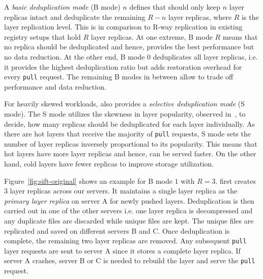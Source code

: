 A \emph{basic deduplication mode} (B mode) $n$ defines that \sysname should only
keep $n$ layer replicas intact and deduplicate the remaining $R-n$ layer
replicas, where $R$ is the layer replication level. This is in comparison to R-way replication in existing registry setups that hold $R$ layer replicas.
%
%
At one extreme, B mode $R$ means that no replica should be deduplicated and
hence, provides the best performance but no data reduction.
%
At the other end, B mode $0$ deduplicates all layer replicas, i.e. it provides
the highest deduplication ratio but adds restoration overhead for every
\texttt{pull} request.
%
The remaining B modes in between allow to trade off performance and data
reduction.
%
 

For heavily skewed workloads, \sysname also provides a \emph{selective
deduplication mode} (S mode).
%
The S mode utilizes the skewness in layer popularity, observed
in~\cite{dockerworkload}, to decide, how many replicas should be deduplicated
for each layer individually.
%
As there are hot layers that receive the majority of \texttt{pull} requests,
S mode sets the number of layer replicas inversely proportional to its
popularity.
%
This means that hot layers have more layer replicas and
hence, can be served faster.
%
On the other hand, cold layers have fewer replicas to improve storage utilization.

Figure~\ref{fig:sift-original} shows an example for B mode $1$ with $R=3$.
\sysname first creates 3 layer replicas across our servers. It maintains a single layer replica as the \emph{primary layer replica} on
server A for newly pushed layers.
%
Deduplication is then carried out in one of the other servers i.e. one layer replica is decompressed and any duplicate
files are discarded while unique files are kept.  The unique files are replicated
and saved on different servers B and C. Once deduplication is complete, the remaining two layer replicas are removed. 
%
Any subsequent \texttt{pull} layer requests are sent to server A since it
stores a complete layer replica.
%
If server A crashes, server B or C is needed to rebuild the layer and serve the
\texttt{pull} request.
%
%

